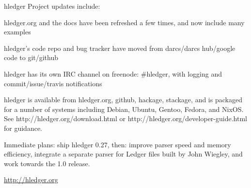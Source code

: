 \documentclass[DIV16,twocolumn,10pt]{scrreprt}
\begin{document}
\begin{hcarentry}{hledger}
Project updates include:
\begin{compactitem}
\item hledger.org and the docs have been refreshed a few times, and now include many examples
\item hledger's code repo and bug tracker have moved from darcs/darcs hub/google code to git/github
\item hledger has its own IRC channel on freenode: #hledger, with logging and commit/issue/travis notifications
\end{compactitem}


hledger is available from hledger.org, github, hackage, stackage, and
is packaged for a number of systems including Debian, Ubuntu, Gentoo,
Fedora, and NixOS.  See http://hledger.org/download.html or
http://hledger.org/developer-guide.html for guidance.


Immediate plans: ship hledger 0.27, then: 
improve parser speed and memory efficiency, 
integrate a separate parser for Ledger files built by John Wiegley,
and work towards the 1.0 release.

\FurtherReading
  \url{http://hledger.org}
\end{hcarentry}
\end{document}
